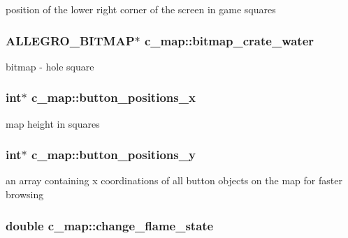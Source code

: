 position of the lower right corner of the screen in game squares \hypertarget{classc__map_a9b6b2ac643bd82db8acf37753e86482b}{
\subsubsection[{bitmap\-\_\-crate\-\_\-water}]{\setlength{\rightskip}{0pt plus 5cm}A\-L\-L\-E\-G\-R\-O\-\_\-\-B\-I\-T\-M\-A\-P$\ast$ c\-\_\-map\-::bitmap\-\_\-crate\-\_\-water\hspace{0.3cm}{\ttfamily [protected]}}}\label{classc__map_a9b6b2ac643bd82db8acf37753e86482b}
bitmap -\/ hole square \hypertarget{classc__map_a4d9edbbf1f0e9465f7e04307af02afab}{
\subsubsection[{button\-\_\-positions\-\_\-x}]{\setlength{\rightskip}{0pt plus 5cm}int$\ast$ c\-\_\-map\-::button\-\_\-positions\-\_\-x\hspace{0.3cm}{\ttfamily [protected]}}}\label{classc__map_a4d9edbbf1f0e9465f7e04307af02afab}
map height in squares \hypertarget{classc__map_a6be0ac983d8dfd2aa801face76908dff}{
\subsubsection[{button\-\_\-positions\-\_\-y}]{\setlength{\rightskip}{0pt plus 5cm}int$\ast$ c\-\_\-map\-::button\-\_\-positions\-\_\-y\hspace{0.3cm}{\ttfamily [protected]}}}\label{classc__map_a6be0ac983d8dfd2aa801face76908dff}
an array containing x coordinations of all button objects on the map for faster browsing \hypertarget{classc__map_af7ac20f46aab8dde2b4459642fd5d3de}{
\subsubsection[{change\-\_\-flame\-\_\-state}]{\setlength{\rightskip}{0pt plus 5cm}double c\-\_\-map\-::change\-\_\-flame\-\_\-state\hspace{0.3cm}{\ttfamily [protected]}}}\label{classc__map_af7ac20f46aab8dde2b4459642fd5d3de}
